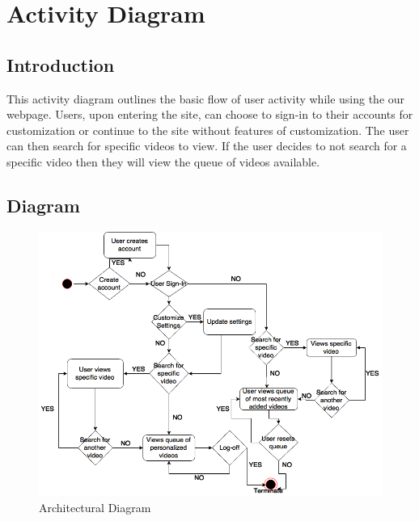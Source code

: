 \chapter{Activity Diagram}

\section{Introduction}
This activity diagram outlines the basic flow of user activity while using the our webpage. Users, upon entering the site, can choose to sign-in to their accounts for customization or continue to the site without features of customization. The user can then search for specific videos to view. If the user decides to not search for a specific video then they will view the queue of videos available.\newpage
\section{Diagram}
\begin{figure}[!ht]
      \centering
      \includegraphics[width=\textwidth]{activityDiagram}
      \caption{Architectural Diagram}	
\end{figure}